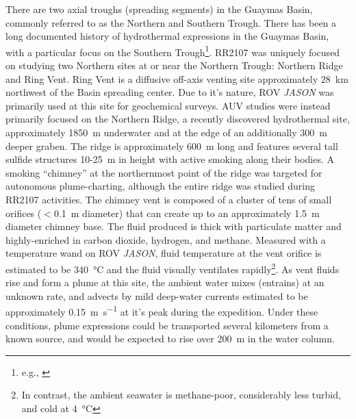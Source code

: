 There are two axial troughs (spreading segments) in the Guaymas Basin, commonly referred to as the Northern and Southern Trough. There has been a long documented history of hydrothermal expressions in the Guaymas Basin, with a particular focus on the Southern Trough\footnote{e.g., \autocite{ondreas2018recent, teske2016guaymas, seewald1994variations, von1985chemistry, lonsdale1985hydrothermal}}. RR2107 was uniquely focused on studying two Northern sites at or near the Northern Trough: Northern Ridge and Ring Vent. Ring Vent is a diffusive off-axis venting site approximately \SI{28}{\kilo\meter} northwest of the Basin spreading center\autocite{teske2019characteristics}. Due to it's nature, ROV \emph{JASON} was primarily used at this site for geochemical surveys. AUV \Sentry studies were instead primarily focused on the Northern Ridge, a recently discovered hydrothermal site\autocite{soule2018exploration, geilert2018formation}, approximately \SI{1850}{\meter} underwater and at the edge of an additionally \SI{300}{\meter} deeper graben. The ridge is approximately \SI{600}{\meter} long and features several tall sulfide structures 10-\SI{25}{\meter} in height with active smoking along their bodies. A smoking ``chimney'' at the northernmost point of the ridge was targeted for autonomous plume-charting, although the entire ridge was studied during RR2107 activities. The chimney vent is composed of a cluster of tens of small orifices ($<$\SI{0.1}{\meter} diameter) that can create up to an approximately \SI{1.5}{\meter} diameter chimney base. The fluid produced is thick with particulate matter and highly-enriched in carbon dioxide, hydrogen, and methane. Measured with a temperature wand on ROV \emph{JASON}, fluid temperature at the vent orifice is estimated to be \SI{340}{\celsius} and the fluid visually ventilates rapidly\footnote{In contrast, the ambient seawater is methane-poor, considerably less turbid, and cold at \SI{4}{\celsius}}. As vent fluids rise and form a plume at this site, the ambient water mixes (entrains) at an unknown rate, and advects by mild deep-water currents estimated to be approximately \SI{0.15}{\meter\per\second} at it's peak during the expedition. Under these conditions, plume expressions could be transported several kilometers from a known source, and would be expected to rise over \SI{200}{\meter} in the water column\autocite{speer1989model}.

